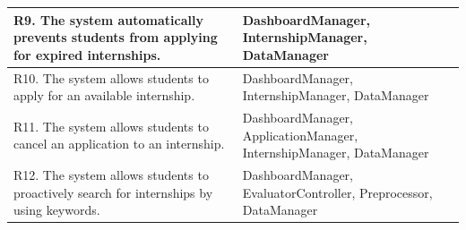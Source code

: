 \documentclass{article}
\begin{document}
\begin{table}[H]
\begin{tabular}{|p{}|p{}|}
        R9. The system automatically prevents students from applying for expired
        internships.\newline
         &
        DashboardManager,\newline
        InternshipManager,\newline
        DataManager\\
        \hline
        R10. The system allows students to apply for an available internship.\newline
         &
        DashboardManager, \newline
        InternshipManager,\newline
        DataManager\\
        \hline
        R11. The system allows students to cancel an application to an internship.\newline
         &
        DashboardManager, \newline
        ApplicationManager, \newline
        InternshipManager,\newline
        DataManager\\
        \hline
        R12. The system allows students to proactively search for internships by
        using keywords.\newline
         &
        DashboardManager, \newline
        EvaluatorController,\newline
        Preprocessor,\newline
        DataManager\\
        \hline







    \end{tabular}
\end{table}

\newpage
\end{document}

